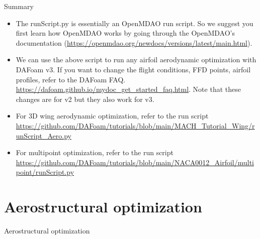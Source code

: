 \documentclass{bredelebeamer}
\begin{document}
\begin{frame}[fragile]{Summary}
    \begin{itemize}
      \setlength\itemsep{1em}
      \item The runScript.py is essentially an OpenMDAO run script. So we suggest you first learn how OpenMDAO works by going through the OpenMDAO's documentation (\url{https://openmdao.org/newdocs/versions/latest/main.html}).
     \item We can use the above script to run any airfoil aerodynamic optimization with DAFoam v3. If you want to change the flight conditions, FFD points, airfoil profiles, refer to the DAFoam FAQ. \url{https://dafoam.github.io/mydoc_get_started_faq.html}. Note that these changes are for v2 but they also work for v3.
     \item For 3D wing aerodynamic optimization, refer to the run script \url{https://github.com/DAFoam/tutorials/blob/main/MACH_Tutorial_Wing/runScript_Aero.py}
     \item For multipoint optimization, refer to the run script \url{https://github.com/DAFoam/tutorials/blob/main/NACA0012_Airfoil/multipoint/runScript.py}
    \end{itemize}
  \end{frame}
  

\section{Aerostructural optimization}
\renewcommand{\arraystretch}{2}

\begin{frame}{}
  \center \Large Aerostructural optimization
\end{frame}
\end{document}
